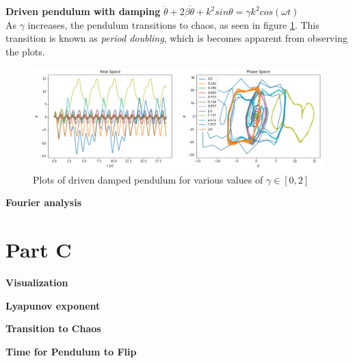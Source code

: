 \documentclass[12pt]{article}
\newenvironment{problem}[2][]{\begin{trivlist}
\item[\hskip \labelsep {\bfseries #1}\hskip \labelsep {\bfseries #2.}]}{\end{trivlist}}
\begin{document}
\begin{problem}{6}
	\textbf{Driven pendulum with damping} $\ddot{\theta}+2\beta\dot{\theta}+k^{2}sin\theta=\gamma k^{2}cos(\omega t)$ \\

As $\gamma$ increases, the pendulum transitions to chaos, as seen in figure \ref{damped}.  This transition is known as \textit{period doubling}, which is becomes apparent from observing the plots.  

\begin{figure}[h!]
	\centering
  	\includegraphics[scale=0.5]{../figures/dampedDriven.png}
 	\caption{Plots of driven damped pendulum for various values of $\gamma \in [0,2]$}
  	\label{damped}
\end{figure}

\end{problem}

\begin{problem}{7}
	\textbf{Fourier analysis}
\end{problem}

\section*{Part C}

\begin{problem}{1}
\textbf{Visualization}

\end{problem}

\begin{problem}{2}
\textbf{Lyapunov exponent}
\end{problem}

\begin{problem}{3}
\textbf{Transition to Chaos}
\end{problem}

\begin{problem}{4}
\textbf{Time for Pendulum to Flip}
\end{problem}
\end{document}
